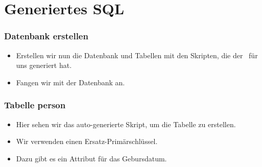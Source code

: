 \documentclass[aspectratio=169,mathserif,notheorems]{beamer}%
\begin{document}
\section{Generiertes SQL}%
%
\begin{frame}[t]%
\frametitle{Datenbank erstellen}%
\begin{itemize}%
\item Erstellen wir nun die Datenbank und Tabellen mit den Skripten, die der \pgmodeler\ für uns generiert hat.%
%
\item<2-> Fangen wir mit der Datenbank an.
\end{itemize}%
%
%
%
\end{frame}%
%
\begin{frame}[t]%
\frametitle{Tabelle person}%
\parbox{0.435\linewidth}{\small%
\begin{itemize}%
%
\item Hier sehen wir das auto-generierte Skript, um die Tabelle  zu erstellen.%
%
\item<2-> Wir verwenden einen Ersatz-Primärschlüssel.%
%
\item<3-> Dazu gibt es ein Attribut  für das Gebursdatum.%
\end{itemize}%
}%
%
\end{frame}%
%
\end{document}
